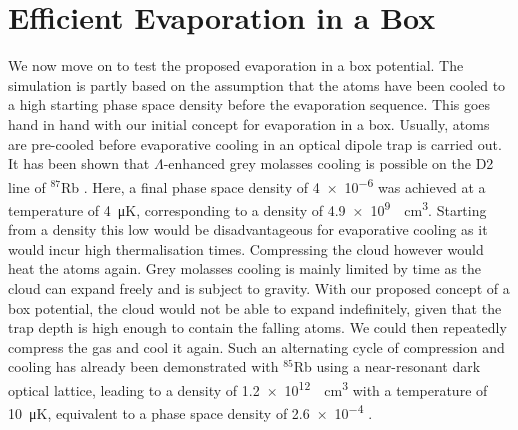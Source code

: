 

\section{Efficient Evaporation in a Box}
\label{sec:eva_test}
We now move on to test the proposed evaporation in a box potential. The simulation is partly based on the assumption that the atoms have been cooled to a high starting phase space density before the evaporation sequence. This goes hand in hand with our initial concept for evaporation in a box. Usually, atoms are pre-cooled before evaporative cooling in an optical dipole trap is carried out. It has been shown that $\Lambda$-enhanced grey molasses cooling is possible on the D2 line of $^{87}$Rb \cite{Rosi2018enhancedGM}. Here, a final phase space density of \num{4e-6} was achieved at a temperature of \SI{4}{\micro\kelvin}, corresponding to a density of \SI{4.9e9}{\per\centi\meter\cubed}. Starting from a density this low would be disadvantageous for evaporative cooling as it would incur high thermalisation times. Compressing the cloud however would heat the atoms again. Grey molasses cooling is mainly limited by time as the cloud can expand freely and is subject to gravity. With our proposed concept of a box potential, the cloud would not be able to expand indefinitely, given that the trap depth is high enough to contain the falling atoms. We could then repeatedly compress the gas and cool it again. Such an alternating cycle of compression and cooling has already been demonstrated with $^{85}$Rb using a near-resonant dark optical lattice, leading to a density of \SI{1.2e12}{\per\centi\meter\cubed} with a temperature of \SI{10}{\micro\kelvin}, equivalent to a phase space density of \num{2.6e-4} \cite{PhysRevA.72.043410}. 

